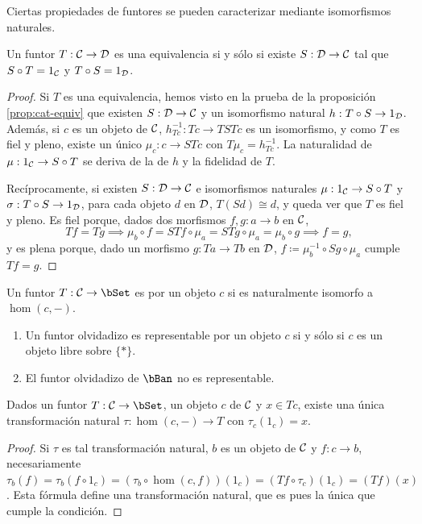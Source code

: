 Ciertas propiedades de funtores se pueden caracterizar mediante isomorfismos
naturales.

\begin{proposition}
  Un funtor $T:\mathcal{C}\to\mathcal{D}$ es una equivalencia si y sólo si existe $S:\mathcal{D}\to\mathcal{C}$
  tal que $S\circ T=1_{\mathcal{C}}$ y $T\circ S=1_{\mathcal{D}}$.
\end{proposition}
\begin{proof}
  Si $T$ es una equivalencia, hemos visto en la prueba de la proposición
  \ref{prop:cat-equiv} que existen $S:\mathcal{D}\to\mathcal{C}$ y un isomorfismo natural
  $h:T\circ S\to 1_{\mathcal{D}}$. Además, si $c$ es un objeto de $\mathcal{C}$,
  $h_{Tc}^{-1}:Tc\to TSTc$ es un isomorfismo, y como $T$ es fiel y pleno, existe
  un único $\mu_c:c\to STc$ con $T\mu_c=h_{Tc}^{-1}$. La naturalidad de
  $\mu:1_{\mathcal{C}}\to S\circ T$ se deriva de la de $h$ y la fidelidad de $T$.

  Recíprocamente, si existen $S:\mathcal{D}\to\mathcal{C}$ e isomorfismos naturales
  $\mu:1_{\mathcal{C}}\to S\circ T$ y $\sigma:T\circ S\to1_{\mathcal{D}}$, para cada objeto $d$ en
  $\mathcal{D}$, $T(Sd)\cong d$, y queda ver que $T$ es fiel y pleno. Es fiel porque,
  dados dos morfismos $f,g:a\to b$ en $\mathcal{C}$,
  \[
    Tf=Tg\implies\mu_b\circ f=STf\circ\mu_a=STg\circ\mu_a=\mu_b\circ g\implies
    f=g,
  \]
  y es plena porque, dado un morfismo $g:Ta\to Tb$ en $\mathcal{D}$,
  $f\coloneqq\mu_b^{-1}\circ Sg\circ\mu_a$ cumple $Tf=g$.
\end{proof}

\begin{definition}
  Un funtor $T:\cC\to\bSet$ es  por un objeto $c$ si es
  naturalmente isomorfo a $\hom(c,-)$.
\end{definition}

\begin{example}\;
  \begin{enumerate}
  \item Un funtor olvidadizo es representable por un objeto $c$ si y sólo si $c$
    es un objeto libre sobre $\{*\}$.
  \item El funtor olvidadizo de $\bBan$ no es representable.
  \end{enumerate}
\end{example}

\begin{proposition}
  Dados un funtor $T:\cC\to\bSet$, un objeto $c$ de $\mathcal{C}$ y $x\in Tc$, existe
  una única transformación natural $\tau:\hom(c,-)\to T$ con $\tau_c(1_c)=x$.
\end{proposition}
\begin{proof}
  Si $\tau$ es tal transformación natural, $b$ es un objeto de $\mathcal{C}$ y
  $f:c\to b$, necesariamente
  $\tau_b(f)=\tau_b(f\circ
  1_c)=(\tau_b\circ\hom(c,f))(1_c)=(Tf\circ\tau_c)(1_c)=(Tf)(x)$. Esta fórmula
  define una transformación natural, que es pues la única que cumple la
  condición.
\end{proof}


